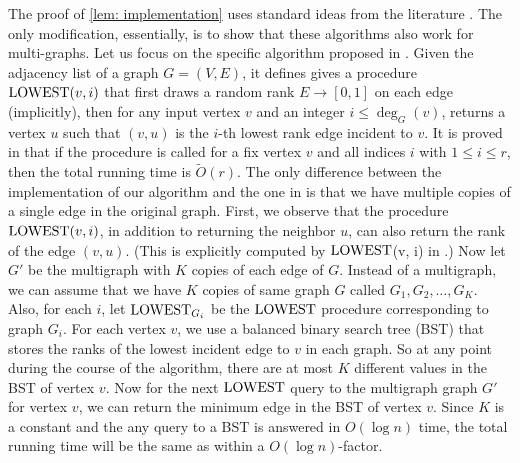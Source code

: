 \documentclass[letterpaper,11pt]{article}
\newcommand{\lowest}[0]{\ensuremath{\textup{LOWEST}}}
\begin{document}
The proof of \cref{lem: implementation} uses standard ideas from the literature \cite{OnakRRR12,behnezhad2021}. The only modification, essentially, is to show that these algorithms also work for multi-graphs. Let us focus on the specific algorithm proposed in \cite[Appendix~A]{behnezhad2021}. Given the adjacency list of a graph $G=(V, E)$, it defines gives a procedure $\lowest(v,i)$ that first draws a random rank $E \to [0, 1]$ on each edge (implicitly), then for any input vertex $v$ and an integer $i \leq \deg_G(v)$, returns a vertex $u$ such that $(v, u)$ is the $i$-th lowest rank edge incident to $v$. It is proved in \cite{behnezhad2021} that if the procedure is called for a fix vertex $v$ and all indices $i$ with $1 \leq i \leq r$, then the total running time is $\tilde{O}(r)$. The only difference between the implementation of our algorithm and the one in \cite{behnezhad2021} is that we have multiple copies of a single edge in the original graph. First, we observe that the procedure $\lowest(v,i)$, in addition to returning the neighbor $u$, can also return the rank of the edge $(v, u)$. (This is explicitly computed by \lowest(v, i) in \cite{behnezhad2021}.) Now let $G'$ be the multigraph with $K$ copies of each edge of $G$. Instead of a multigraph, we can assume that we have $K$ copies of same graph $G$ called $G_1, G_2, \ldots, G_K$. Also, for each $i$, let $\lowest_{G_i}$ be the \lowest{} procedure corresponding to graph $G_i$. For each vertex $v$, we use a balanced binary search tree (BST) that stores the ranks of the lowest incident edge to $v$ in each graph. So at any point during the course of the algorithm, there are at most $K$ different values in the BST of vertex $v$. Now for the next \lowest{} query to the multigraph graph $G'$ for vertex $v$, we can return the minimum edge in the BST of vertex $v$. Since $K$ is a constant and the any query to a BST is answered in $O(\log n)$ time, the total running time will be the same as \cite[Appendix~A]{behnezhad2021} within a $O(\log n)$-factor.
	
\end{document}
